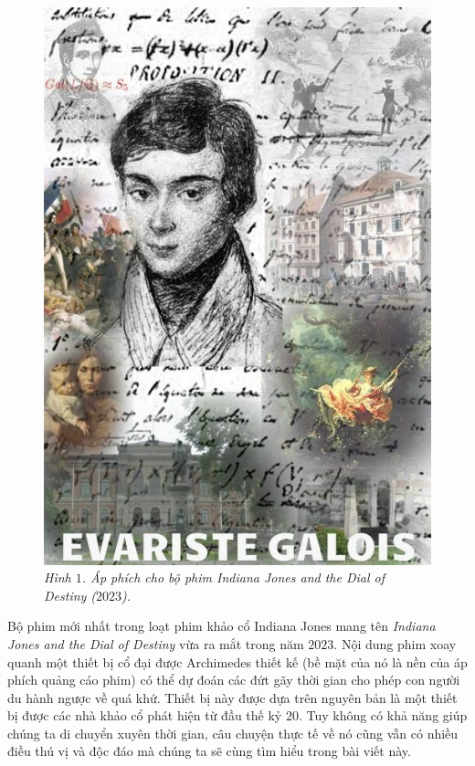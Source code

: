 \vspace*{55pt}

\begin{multicols}{2}
	\begin{figure}[H]
		\vspace*{5pt}
		\centering
		\captionsetup{labelformat= empty, justification=centering}
		\includegraphics[width= 1\linewidth]{1}
		\caption{\small\textit{\color{lichsutoanhoc}Hình $1$. Áp phích cho bộ phim Indiana Jones and the Dial of Destiny ($2023$).}}
		\vspace*{-10pt}
	\end{figure}
	Bộ phim mới nhất trong loạt phim khảo cổ Indiana Jones mang tên \textit{Indiana Jones and the Dial of Destiny} vừa ra mắt trong năm $2023$. Nội dung phim xoay quanh một thiết bị cổ đại được Archimedes thiết kế (bề mặt của nó là nền của áp phích quảng cáo phim) có thể dự đoán các đứt gãy thời gian cho phép con người du hành ngược về quá khứ. Thiết bị này được dựa trên nguyên bản là một thiết bị được các nhà khảo cổ phát hiện từ đầu thế kỷ $20$. Tuy không có khả năng giúp chúng ta di chuyển xuyên thời gian, câu chuyện thực tế về nó cũng vẫn có nhiều điều thú vị và độc đáo mà chúng ta sẽ cùng tìm hiểu trong bài viết này.

\end{multicols}
